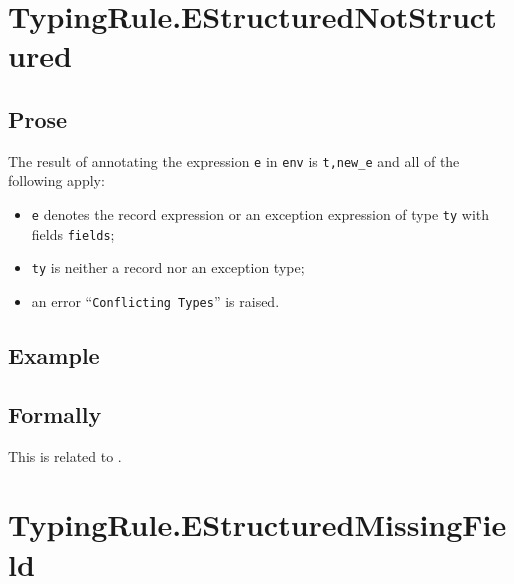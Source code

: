 \documentclass{book}
\begin{document}
\begin{itemize}

\section{TypingRule.EStructuredNotStructured \label{sec:TypingRule.EStructuredNotStructured}}

  \subsection{Prose}
  The result of annotating the expression \texttt{e} in \texttt{env} is
\texttt{t,new\_e} and all of the following apply:
  \begin{itemize}
  \item \texttt{e} denotes the record expression or an exception expression of type \texttt{ty} with fields \texttt{fields};
  \item \texttt{ty} is neither a record nor an exception type;
  \item an error ``\texttt{Conflicting Types}'' is raised.
  \end{itemize}

  \subsection{Example}



\begin{emptyformal}
    \subsection{Formally}
\end{emptyformal}


  This is related to .

\section{TypingRule.EStructuredMissingField \label{sec:TypingRule.EStructuredMissingField}}


\end{itemize}
\end{document}

